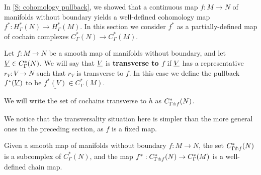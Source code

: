 In \cref{S: cohomology pullback}, we showed that a continuous map $f \colon M \to N$ of manifolds without boundary yields a well-defined cohomology map $f^* \colon H^*_\Gamma(N) \to H^*_\Gamma(M)$.
In this section we consider $f^*$ as a partially-defined map of cochain complexes $C^*_\Gamma(N) \to C^*_\Gamma(M)$.

\begin{definition}\label{D: transverse to map}
	Let $f \colon M \to N$ be a smooth map of manifolds without boundary, and let $\underline{V} \in C^*_\Gamma(N)$.
	We will say that $\underline{V}$ is \textbf{transverse to $f$} if $\underline{V}$ has a representative $r_V \colon V \to N$ such that $r_V$ is transverse to $f$.
	In this case we define the pullback $f^*(\underline{V})$ to be $\underline{f^*(V)} \in C^*_\Gamma(M)$.

	We will write the set of cochains transverse to $h$ as $C^*_{\Gamma \pitchfork f}(N)$.
\end{definition}

We notice that the transversality situation here is simpler than the more general ones in the preceding section, as $f$ is a fixed map.

\begin{proposition}\label{P: trans to f}
	Given a smooth map of manifolds without boundary $f \colon M \to N$, the set $C^*_{\Gamma \pitchfork f}(N)$ is a subcomplex of $C^*_{\Gamma}(N)$, and the map $f^*:C^*_{\Gamma \pitchfork f}(N) \to C^*_{\Gamma}(M)$ is a well-defined chain map.
\end{proposition}

